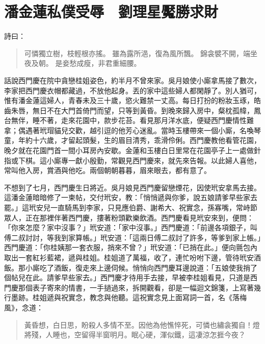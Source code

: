 
\chapter{潘金蓮私僕受辱　劉理星魘勝求財}

詩曰：
\begin{quote}
可憐獨立樹，枝輕根亦搖。
雖為露所浥，復為風所飄。
錦衾襞不開，端坐夜及朝。
是妾愁成瘦，非君重細腰。
\end{quote}

話說西門慶在院中貪戀桂姐姿色，約半月不曾來家。吳月娘使小廝拿馬接了數次，李家把西門慶衣帽都藏過，不放他起身。丟的家中這些婦人都閑靜了。別人猶可，惟有潘金蓮這婦人，青春未及三十歲，慾火難禁一丈高。每日打扮的粉妝玉琢，皓齒朱唇，無日不在大門首倚門而望，只等到黃昏。到晚來歸入房中，粲枕孤幃，鳳台無伴，睡不著，走來花園中，款步花苔。看見那月洋水底，便疑西門慶情性難拿；偶遇著玳瑁貓兒交歡，越引逗的他芳心迷亂。當時玉樓帶來一個小廝，名喚琴童，年約十六歲，才留起頭髮，生的眉目清秀，乖滑伶俐。西門慶教他看管花園，晚夕就在花園門首一間小耳房內安歇。金蓮和玉樓白日里常在花園亭子上一處做針指或下棋。這小廝專一獻小殷勤，常觀見西門慶來，就先來告報。以此婦人喜他，常叫他入房，賞酒與他吃。兩個朝朝暮暮，眉來眼去，都有意了。

不想到了七月，西門慶生日將近。吳月娘見西門慶留戀煙花，因使玳安拿馬去接。這潘金蓮暗暗修了一柬帖，交付玳安，教：「悄悄遞與你爹，說五娘請爹早些家去罷。」這玳安兒一直騎馬到李家，只見應伯爵、謝希大、祝實念，孫寡嘴，常峙節眾人，正在那裡伴著西門慶，摟著粉頭歡樂飲酒。西門慶看見玳安來到，便問：「你來怎麼？家中沒事？」玳安道：「家中沒事。」西門慶道：「前邊各項銀子，叫傅二叔討討，等我到家算帳。」玳安道：「這兩日傅二叔討了許多，等爹到家上帳。」西門慶道：「你桂姨那一套衣服，捎來不曾？」玳安道：「已捎在此。」便向氈包內取出一套紅衫藍裙，遞與桂姐。桂姐道了萬福，收了，連忙吩咐下邊，管待玳安酒飯。那小廝吃了酒飯，復走來上邊伺候。悄悄向西門慶耳邊說道：「五娘使我捎了個帖兒在此。請爹早些家去。」西門慶才待用手去接，早被李桂姐看見，只道是西門慶那個表子寄來的情書，一手撾過來，拆開觀看，卻是一幅迴文錦箋，上寫著幾行墨跡。桂姐遞與祝實念，教念與他聽。這祝實念見上面寫詞一首，名《落梅風》，念道：
\begin{quote}
黃昏想，白日思，盼殺人多情不至。因他為他憔悴死，可憐也繡衾獨自！燈將殘，人睡也，空留得半窗明月。眠心硬，渾似鐵，這凄涼怎捱今夜？
\end{quote}

